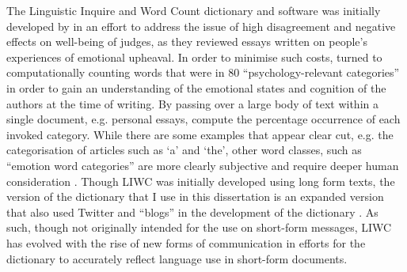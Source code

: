 The Linguistic Inquire and Word Count dictionary and software was initially developed by \citet{Pennebaker:2001} in an effort to address the issue of high disagreement and negative effects on well-being of judges, as they reviewed essays written on people's experiences of emotional upheaval. In order to minimise such costs, \citet{Pennebaker:2001} turned to computationally counting words that were in $80$ ``psychology-relevant categories'' in order to gain an understanding of the emotional states and cognition of the authors at the time of writing. By passing over a large body of text within a single document, e.g. personal essays, \citet{Pennebaker:2001} compute the percentage occurrence of each invoked category. While there are some examples that appear clear cut, e.g. the categorisation of articles such as `a' and `the',
other word classes, such as ``emotion word categories'' are more clearly subjective and require deeper human consideration \citep{Tauscik:2010}.
Though LIWC was initially developed using long form texts, the version of the dictionary that I use in this dissertation is an expanded version that also used Twitter and ``blogs'' in the development of the dictionary \citep{Pennebaker:2015}. As such, though not originally intended for the use on short-form messages, LIWC has evolved with the rise of new forms of communication in efforts for the dictionary to accurately reflect language use in short-form documents.
